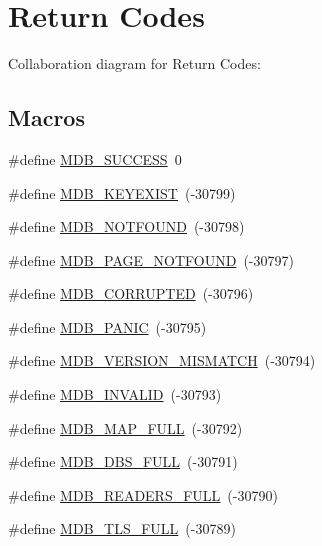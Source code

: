 \hypertarget{group__errors}{}\section{Return Codes}
\label{group__errors}
Collaboration diagram for Return Codes\+:
\subsection*{Macros}
\begin{DoxyCompactItemize}
\item 
\#define \mbox{\hyperlink{group__errors_gad01fd0bf65d986197e7bf63024278ab6}{M\+D\+B\+\_\+\+S\+U\+C\+C\+E\+SS}}~0
\item 
\#define \mbox{\hyperlink{group__errors_ga05dc5bbcc7da81a7345bd8676e8e0e3b}{M\+D\+B\+\_\+\+K\+E\+Y\+E\+X\+I\+ST}}~(-\/30799)
\item 
\#define \mbox{\hyperlink{group__errors_gabeb52e4c4be21b329e31c4add1b71926}{M\+D\+B\+\_\+\+N\+O\+T\+F\+O\+U\+ND}}~(-\/30798)
\item 
\#define \mbox{\hyperlink{group__errors_ga7b77315de5265d94cae12609b0fe1f44}{M\+D\+B\+\_\+\+P\+A\+G\+E\+\_\+\+N\+O\+T\+F\+O\+U\+ND}}~(-\/30797)
\item 
\#define \mbox{\hyperlink{group__errors_gaf8148bf1b85f58e264e57194bafb03ef}{M\+D\+B\+\_\+\+C\+O\+R\+R\+U\+P\+T\+ED}}~(-\/30796)
\item 
\#define \mbox{\hyperlink{group__errors_gae37b9aedcb3767faba3de8c1cf6d3473}{M\+D\+B\+\_\+\+P\+A\+N\+IC}}~(-\/30795)
\item 
\#define \mbox{\hyperlink{group__errors_ga909b2db047fa90fb0d37a78f86a6f99b}{M\+D\+B\+\_\+\+V\+E\+R\+S\+I\+O\+N\+\_\+\+M\+I\+S\+M\+A\+T\+CH}}~(-\/30794)
\item 
\#define \mbox{\hyperlink{group__errors_ga9c2257e8cd8ea027cb682588b235a6f0}{M\+D\+B\+\_\+\+I\+N\+V\+A\+L\+ID}}~(-\/30793)
\item 
\#define \mbox{\hyperlink{group__errors_ga0a83370402a060c9175100d4bbfb9f25}{M\+D\+B\+\_\+\+M\+A\+P\+\_\+\+F\+U\+LL}}~(-\/30792)
\item 
\#define \mbox{\hyperlink{group__errors_ga6288de36b58badda2e5a64ecddd1da70}{M\+D\+B\+\_\+\+D\+B\+S\+\_\+\+F\+U\+LL}}~(-\/30791)
\item 
\#define \mbox{\hyperlink{group__errors_gadd6aaa88823710b97cc44f4f8c160799}{M\+D\+B\+\_\+\+R\+E\+A\+D\+E\+R\+S\+\_\+\+F\+U\+LL}}~(-\/30790)
\item 
\#define \mbox{\hyperlink{group__errors_gabe74ed736c4594b8e1c6f1b86b77f8f4}{M\+D\+B\+\_\+\+T\+L\+S\+\_\+\+F\+U\+LL}}~(-\/30789)

\end{DoxyCompactItemize}
